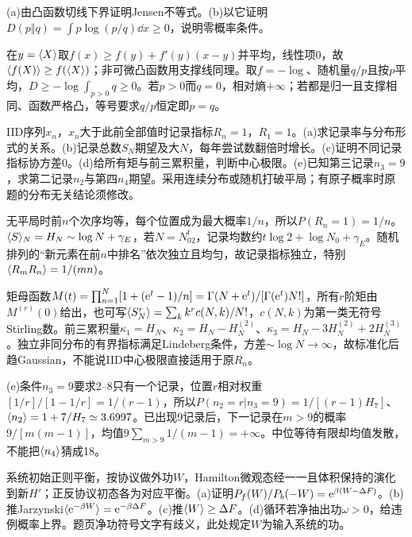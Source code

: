 \begin{exercise}[原题4(a)--(b)]\label{p:333-2-4}
(a)由凸函数切线下界证明Jensen不等式。(b)以它证明$D(p\Vert q)=\int p\log(p/q)\dd x\ge0$，说明零概率条件。
\end{exercise}
\begin{solution}
在$y=\langle X\rangle$取$f(x)\ge f(y)+f'(y)(x-y)$并平均，线性项0，故$\langle f(X)\rangle\ge f(\langle X\rangle)$；非可微凸函数用支撑线同理。取$f=-\log$、随机量$q/p$且按$p$平均，$D\ge-\log\int_{p>0}q\ge0$。若$p>0$而$q=0$，相对熵$+\infty$；若都是归一且支撑相同、函数严格凸，等号要求$q/p$恒定即$p=q$。
\end{solution}
\begin{exercise}[原题5(a)--(e)，(e)选做]\label{p:333-2-5}
IID序列$x_n$，$x_n$大于此前全部值时记录指标$R_n=1$，$R_1=1$。(a)求记录率与分布形式的关系。(b)记录总数$S_N$期望及大$N$，每年尝试数翻倍时增长。(c)证明不同记录指标协方差0。(d)给所有矩与前三累积量，判断中心极限。(e)已知第三记录$n_3=9$，求第二记录$n_2$与第四$n_4$期望。采用连续分布或随机打破平局；有原子概率时原题的分布无关结论须修改。
\end{exercise}
\begin{solution}
无平局时前$n$个次序均等，每个位置成为最大概率$1/n$，所以$P(R_n=1)=1/n$。$\langle S\rangle_N=H_N\sim\log N+\gamma_E$，若$N=N_02^t$，记录均数约$t\log2+\log N_0+\gamma_E$。随机排列的“新元素在前$n$中排名”依次独立且均匀，故记录指标独立，特别$\langle R_mR_n\rangle=1/(mn)$。

矩母函数$M(t)=\prod_{n=1}^N[1+(\mathrm e^t-1)/n]=\Gamma(N+\mathrm e^t)/[\Gamma(\mathrm e^t)N!]$，所有$r$阶矩由$M^{(r)}(0)$给出，也可写$\langle S_N^r\rangle=\sum_k k^r c(N,k)/N!$，$c(N,k)$为第一类无符号Stirling数。前三累积量$\kappa_1=H_N$、$\kappa_2=H_N-H_N^{(2)}$、$\kappa_3=H_N-3H_N^{(2)}+2H_N^{(3)}$。独立非同分布的有界指标满足Lindeberg条件，方差$\sim\log N\to\infty$，故标准化后趋Gaussian，不能说IID中心极限直接适用于原$R_n$。

(e)条件$n_3=9$要求2--8只有一个记录，位置$r$相对权重$[1/r]/[1-1/r]=1/(r-1)$，所以$P(n_2=r|n_3=9)=1/[(r-1)H_7]$、$\langle n_2\rangle=1+7/H_7\simeq3.6997$。已出现9记录后，下一记录在$m>9$的概率$9/[m(m-1)]$，均值$9\sum_{m>9}1/(m-1)=+\infty$。中位等待有限却均值发散，不能把$\langle n_4\rangle$猜成18。
\end{solution}
\begin{exercise}[原题6(a)--(d)]\label{p:333-2-6}
系统初始正则平衡，按协议做外功$W$，Hamilton微观态经一一且体积保持的演化到新$H'$；正反协议初态各为对应平衡。(a)证明$P_f(W)/P_b(-W)=\mathrm e^{\beta(W-\Delta F)}$。(b)推Jarzynski$\langle \mathrm e^{-\beta W}\rangle=\mathrm e^{-\beta\Delta F}$。(c)推$\langle W\rangle\ge\Delta F$。(d)循环若净抽出功$\omega>0$，给违例概率上界。题页净功符号文字有歧义，此处规定$W$为输入系统的功。
\end{exercise}
